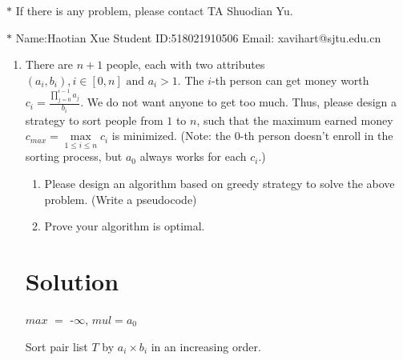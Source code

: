 \documentclass[12pt,a4paper]{article}
\theoremstyle{definition}
\begin{document}
\noindent

\noindent{}
\begin{center}
\footnotesize{\color{red}$*$ If there is any problem, please contact TA Shuodian Yu.}

\footnotesize{\color{blue}$*$ Name:Haotian Xue  \quad Student ID:518021910506 \quad Email: xavihart@sjtu.edu.cn}
\end{center}

\begin{enumerate}
    \item
    There are $n+1$ people, each with two attributes $(a_i,b_i), i\in[0,n] \text{ and } a_i>1$. The $i$-th person can get money worth $c_i = \frac{\prod_{j=0}^{i-1}{a_j}}{b_i}$. We do not want anyone to get too much. Thus, please design a strategy to sort people from $1$ to $n$, such that the maximum earned money $c_{max}=\max\limits_{1\leq i\leq n} c_i$ is minimized. (Note: the 0-th person doesn't enroll in the sorting process, but $a_0$ always works for each $c_i$.)
    \begin{enumerate}
        \item Please design an algorithm based on greedy strategy to solve the above problem. (Write a pseudocode)
        \item Prove your algorithm is optimal.
    \end{enumerate}

    \section*{\normalsize{Solution}}
        \begin{minipage}[t]{0.80\textwidth}
       \begin{algorithm}[H]
           $max$ $=$ -$\infty$, $mul=a_0$
           
           Sort pair list $T$ by $a_i \times b_i$ in an increasing order.

        \end{algorithm}
        \end{minipage} 
    

\end{enumerate}
\end{document}
